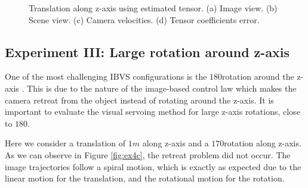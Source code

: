 \begin{figure}[ht!]
\begin{subfigure}{.48\linewidth}
    \caption{}
    \label{fig:ex2cerror}
  \end{subfigure}
  \caption{Translation along z-axis using estimated tensor. (a) Image view. (b) Scene view. (c) Camera velocities. (d) Tensor coefficients error.}
  \label{fig:ex2c}
\end{figure}

\subsection{Experiment III: Large rotation around z-axis}
One of the most challenging IBVS configurations is the $180$\textdegree rotation around the z-axis \cite{chaumette2006visual}\cite{chaumette1998potential}. This is due to the nature of the image-based control law which makes the camera retreat from the object instead of rotating around the z-axis. It is important to evaluate the visual servoing method for large z-axis rotations, close to $180$\textdegree.

Here we consider a translation of $1m$ along z-axis and a $170$\textdegree rotation along z-axis. As we can observe in Figure \ref{fig:ex4c}, the retreat problem did not occur. The image trajectories follow a spiral motion, which is exactly as expected due to the linear motion for the translation, and the rotational motion for the rotation.

